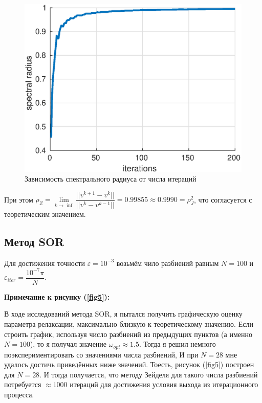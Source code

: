 \documentclass[12pt]{article}
\begin{document}
\begin{figure}[H]
\centerline{\includegraphics[scale = 0.8]{zeidelSpectre.eps}}
\caption{Зависимость спектрального радиуса от числа итераций}
\end{figure} 

При этом $\rho_{Z} = \lim\limits_{k\rightarrow \inf}{\dfrac{||v^{k+1} - v^{k}||}{||v^{k} - v^{k-1}||}} = 0.99855 \approx 0.9990 = \rho_{J}^2$, что согласуется с теоретическим значением.

\subsection{Метод SOR}

Для достижения точности $\varepsilon = 10^{-3}$ возьмём чило разбиений равным $N = 100$ и $\varepsilon_{iter} = \dfrac{10^{-7}\pi}{N}$.

\textbf{Примечание к рисунку (\ref{fig5}):}

В ходе исследований метода SOR, я пытался получить графическую оценку параметра релаксации, максимально близкую к теоретическому значению. Если строить график, используя число разбиений из предыдущих пунктов (а именно $N = 100$), то я получал значение $\omega_{opt} \approx 1.5$. Тогда я решил немного поэкспериментировать со значениями числа разбиений, И при $N = 28$ мне удалось достичь приведённых ниже значений. Тоесть, рисунок (\ref{fig5}) построен для $N = 28$. И тогда получается, что методу Зейделя для такого числа разбиений потребуется $\approx 1000$ итераций для достижения условия выхода из итерационного процесса. 
\end{document}
